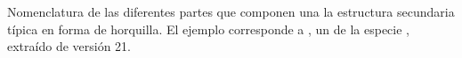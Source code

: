 \label{fig:hairpin-parts} Nomenclatura de las diferentes partes que
componen una la estructura secundaria típica en forma de horquilla.
El ejemplo corresponde a , un \premirna{} de la especie
, extraído de \work\mirbase{} versión 21.
